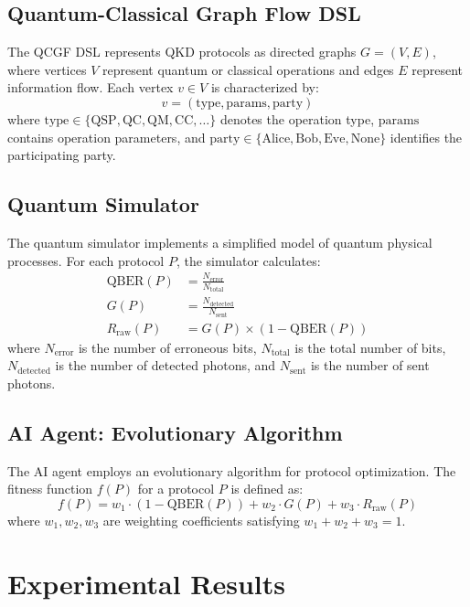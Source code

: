 \documentclass[aps,prl,reprint,superscriptaddress]{revtex4-2}
\newcommand{\qber}{\text{QBER}}
\newcommand{\gain}{G}
\begin{document}
\subsection{Quantum-Classical Graph Flow DSL}
The QCGF DSL represents QKD protocols as directed graphs $G = (V, E)$, where vertices $V$ represent quantum or classical operations and edges $E$ represent information flow. Each vertex $v \in V$ is characterized by:
\begin{equation}
v = (\text{type}, \text{params}, \text{party})
\end{equation}
where $\text{type} \in \{\text{QSP}, \text{QC}, \text{QM}, \text{CC}, \ldots\}$ denotes the operation type, $\text{params}$ contains operation parameters, and $\text{party} \in \{\text{Alice}, \text{Bob}, \text{Eve}, \text{None}\}$ identifies the participating party.

\subsection{Quantum Simulator}
The quantum simulator implements a simplified model of quantum physical processes. For each protocol $P$, the simulator calculates:
\begin{align}
\qber(P) &= \frac{N_{\text{error}}}{N_{\text{total}}} \\
\gain(P) &= \frac{N_{\text{detected}}}{N_{\text{sent}}} \\
R_{\text{raw}}(P) &= \gain(P) \times (1 - \qber(P))
\end{align}
where $N_{\text{error}}$ is the number of erroneous bits, $N_{\text{total}}$ is the total number of bits, $N_{\text{detected}}$ is the number of detected photons, and $N_{\text{sent}}$ is the number of sent photons.

\subsection{AI Agent: Evolutionary Algorithm}
The AI agent employs an evolutionary algorithm for protocol optimization. The fitness function $f(P)$ for a protocol $P$ is defined as:
\begin{equation}
f(P) = w_1 \cdot (1 - \qber(P)) + w_2 \cdot \gain(P) + w_3 \cdot R_{\text{raw}}(P)
\end{equation}
where $w_1, w_2, w_3$ are weighting coefficients satisfying $w_1 + w_2 + w_3 = 1$.

\section{Experimental Results}
\end{document}
